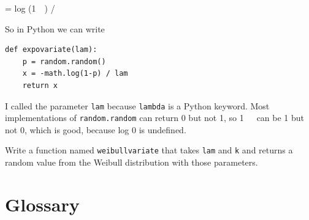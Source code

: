\documentclass[12pt]{book}
\begin{document}
\quad \x = \minus log (1~\minus~\p) / \mylambda

So in Python we can write
%
\begin{verbatim}
def expovariate(lam):
    p = random.random()
    x = -math.log(1-p) / lam
    return x
\end{verbatim}

I called the parameter \verb"lam" because \verb"lambda" is a Python
keyword.  Most implementations of {\tt random.random} can return 0 but
not 1, so 1~\minus~\p~can be 1 but not 0, which is good, because log 0 is
undefined.

\begin{exercise}
Write a function named \verb"weibullvariate" that takes
\verb"lam" and \verb"k" and returns a random value from the Weibull
distribution with those parameters.

\end{exercise}


\section{Glossary}
\end{document}
